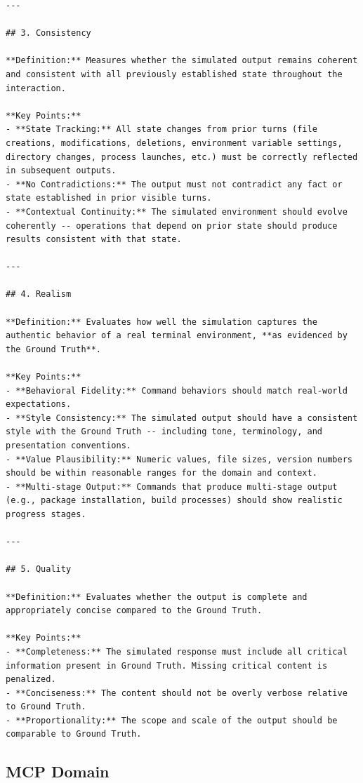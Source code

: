 \begin{lstlisting}
---

## 3. Consistency

**Definition:** Measures whether the simulated output remains coherent and consistent with all previously established state throughout the interaction.

**Key Points:**
- **State Tracking:** All state changes from prior turns (file creations, modifications, deletions, environment variable settings, directory changes, process launches, etc.) must be correctly reflected in subsequent outputs.
- **No Contradictions:** The output must not contradict any fact or state established in prior visible turns.
- **Contextual Continuity:** The simulated environment should evolve coherently -- operations that depend on prior state should produce results consistent with that state.

---

## 4. Realism

**Definition:** Evaluates how well the simulation captures the authentic behavior of a real terminal environment, **as evidenced by the Ground Truth**.

**Key Points:**
- **Behavioral Fidelity:** Command behaviors should match real-world expectations.
- **Style Consistency:** The simulated output should have a consistent style with the Ground Truth -- including tone, terminology, and presentation conventions.
- **Value Plausibility:** Numeric values, file sizes, version numbers should be within reasonable ranges for the domain and context.
- **Multi-stage Output:** Commands that produce multi-stage output (e.g., package installation, build processes) should show realistic progress stages.

---

## 5. Quality

**Definition:** Evaluates whether the output is complete and appropriately concise compared to the Ground Truth.

**Key Points:**
- **Completeness:** The simulated response must include all critical information present in Ground Truth. Missing critical content is penalized.
- **Conciseness:** The content should not be overly verbose relative to Ground Truth.
- **Proportionality:** The scope and scale of the output should be comparable to Ground Truth.
\end{lstlisting}

\subsection{MCP Domain}
\label{sec:appendix:judge_mcp}

